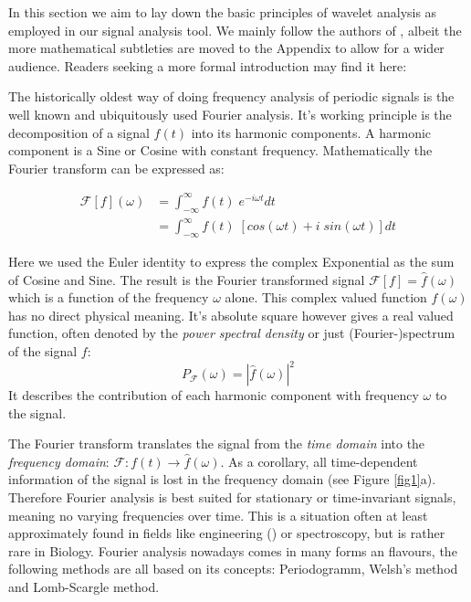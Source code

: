 In this section we aim to lay down the basic principles of wavelet analysis as employed in our signal analysis tool. We mainly follow the authors of \cite{Torrence1998}, albeit the more mathematical subtleties are moved to the Appendix to allow for a wider audience. Readers seeking a more formal introduction may find it here: \cite{Daubechies1992, Mallat1999} 

The historically oldest way of doing frequency analysis of periodic signals is the well known and ubiquitously used Fourier analysis. It's working principle is the decomposition of a signal $f(t)$ into its harmonic components. A harmonic component is a Sine or Cosine with constant frequency. Mathematically the Fourier transform can be expressed as:

\begin{align}
  \label{Ftrafo}
  \mathcal{F}[f](\omega) &= \int_{-\infty}^{\infty} f(t)\;e^{- i \omega t} dt \\
  &= \int_{-\infty}^{\infty} f(t)\; \left[cos(\omega t) + i\;sin(\omega t) \right] dt
\end{align}

Here we used the Euler identity to express the complex Exponential as the sum of Cosine and Sine. The result is the Fourier transformed signal $\mathcal{F}[f] = \widehat{f}(\omega)$ which is a function of the frequency $\omega$ alone. 
This complex valued function $\widehat{f}(\omega)$ has no direct physical meaning. It's absolute square however gives a real valued function, often denoted by the \textit{power spectral density} or just (Fourier-)spectrum of the signal $f$:
\begin{equation}
  P_\mathcal{F}(\omega) = |\widehat{f}(\omega)|^2
\end{equation}
It describes the contribution of each harmonic component with frequency $\omega$ to the signal. 

The Fourier transform translates the signal from the \textit{time domain} into the \textit{frequency domain}: $\mathcal{F} : f(t) \rightarrow \widehat{f}(\omega)$. As a corollary, all time-dependent information of the signal is lost in the frequency domain (see Figure \ref{fig1}a). Therefore Fourier analysis is best suited for stationary or time-invariant signals, meaning no varying frequencies over time. This is a situation often at least approximately found in fields like engineering (\cite{Smith1997}) or spectroscopy, but is rather rare in Biology. Fourier analysis nowadays comes in many forms an flavours, the following methods are all based on its concepts: Periodogramm, Welsh's method and Lomb-Scargle method.

